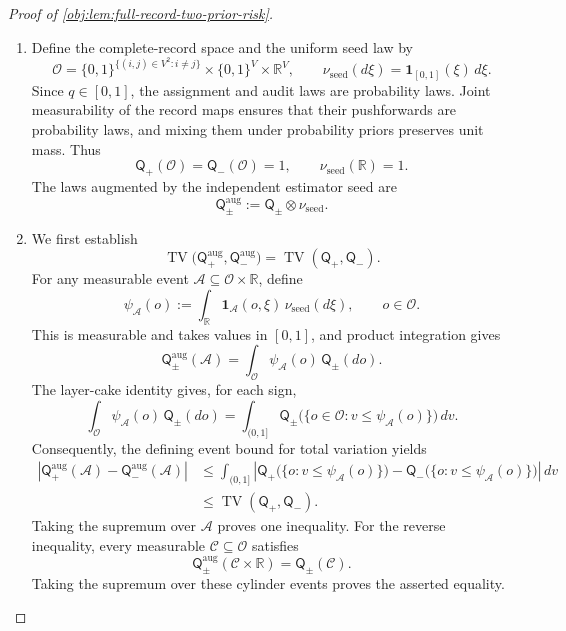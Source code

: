 \begin{proof}[Proof of \cref{obj:lem:full-record-two-prior-risk}]
\begin{enumerate}
\item Define the complete-record space and the uniform seed law by
\[
\mathcal O
=
\{0,1\}^{\{(i,j)\in V^2:i\ne j\}}
\times\{0,1\}^{V}\times\mathbb R^{V},
\qquad
\nu_{\mathrm{seed}}(d\xi)
=
\mathbf1_{[0,1]}(\xi)\,d\xi.
\]
Since \(q\in[0,1]\), the assignment and audit laws are probability laws. Joint measurability of the record maps ensures that their pushforwards are probability laws, and mixing them under probability priors preserves unit mass. Thus
\[
\mathsf Q_+(\mathcal O)=\mathsf Q_-(\mathcal O)=1,
\qquad
\nu_{\mathrm{seed}}(\mathbb R)=1.
\]
The laws augmented by the independent estimator seed are
\[
\mathsf Q_\pm^{\mathrm{aug}}
:=
\mathsf Q_\pm\otimes\nu_{\mathrm{seed}}.
\]

\item We first establish
\begin{equation}\label{eq:full-record-two-prior-tv-seed}
\operatorname{TV}
\bigl(\mathsf Q_+^{\mathrm{aug}},\mathsf Q_-^{\mathrm{aug}}\bigr)
=
\operatorname{TV}(\mathsf Q_+,\mathsf Q_-).
\end{equation}
For any measurable event \(\mathcal A\subseteq\mathcal O\times\mathbb R\), define
\[
\psi_{\mathcal A}(o)
:=
\int_{\mathbb R}\mathbf1_{\mathcal A}(o,\xi)\,
\nu_{\mathrm{seed}}(d\xi),
\qquad o\in\mathcal O.
\]
This is measurable and takes values in \([0,1]\), and product integration gives
\[
\mathsf Q_\pm^{\mathrm{aug}}(\mathcal A)
=
\int_{\mathcal O}\psi_{\mathcal A}(o)\,\mathsf Q_\pm(do).
\]
The layer-cake identity gives, for each sign,
\[
\int_{\mathcal O}\psi_{\mathcal A}(o)\,\mathsf Q_\pm(do)
=
\int_{(0,1]}
\mathsf Q_\pm\bigl(\{o\in\mathcal O:v\le\psi_{\mathcal A}(o)\}\bigr)\,dv.
\]
Consequently, the defining event bound for total variation yields
\[
\begin{aligned}
\left|
\mathsf Q_+^{\mathrm{aug}}(\mathcal A)
-\mathsf Q_-^{\mathrm{aug}}(\mathcal A)
\right|
&\le
\int_{(0,1]}
\left|
\mathsf Q_+\bigl(\{o:v\le\psi_{\mathcal A}(o)\}\bigr)
-\mathsf Q_-\bigl(\{o:v\le\psi_{\mathcal A}(o)\}\bigr)
\right|\,dv\\
&\le \operatorname{TV}(\mathsf Q_+,\mathsf Q_-).
\end{aligned}
\]
Taking the supremum over \(\mathcal A\) proves one inequality. For the reverse inequality, every measurable \(\mathcal C\subseteq\mathcal O\) satisfies
\[
\mathsf Q_\pm^{\mathrm{aug}}(\mathcal C\times\mathbb R)
=
\mathsf Q_\pm(\mathcal C).
\]
Taking the supremum over these cylinder events proves the asserted equality.


\end{enumerate}
\end{proof}
